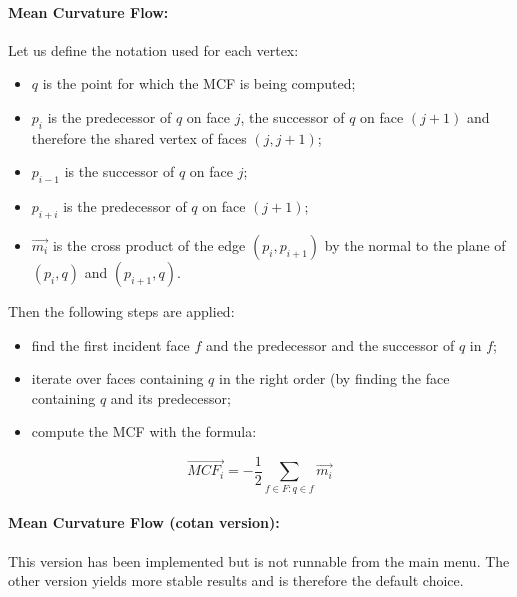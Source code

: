 \documentclass{article}
\begin{document}
\paragraph*{Mean Curvature Flow:}
Let us define the notation used for each vertex:
\begin{itemize}
  \item $q$ is the point for which the MCF is being computed;
  \item $p_i$ is the predecessor of $q$ on face $j$, the successor of $q$ on face $(j+1)$
    and therefore the shared vertex of faces $(j, j+1)$;
  \item $p_{i-1}$ is the successor of $q$ on face $j$;
  \item $p_{i+i}$ is the predecessor of $q$ on face $(j+1)$;
  \item $\overrightarrow{m_i}$ is the cross product of the edge $(p_i, p_{i+1})$
    by the normal to the plane of $(p_i, q)$ and $(p_{i+1},q)$.
\end{itemize}
Then the following steps are applied:
\begin{itemize}
  \item find the first incident face $f$ and the predecessor and the successor of $q$ in $f$;
  \item iterate over faces containing $q$ in the right order (by finding the face
    containing $q$ and its predecessor;
  \item compute the MCF with the formula:
\end{itemize}
\begin{equation*}
  \overrightarrow{MCF_i} = -\frac{1}{2} \sum_{f \in F : q \in f}
    \overrightarrow{m_i}
\end{equation*}

\paragraph*{Mean Curvature Flow (cotan version):}
This version has been implemented but is not runnable from the main menu.
The other version yields more stable results and is therefore the default choice.
\end{document}
